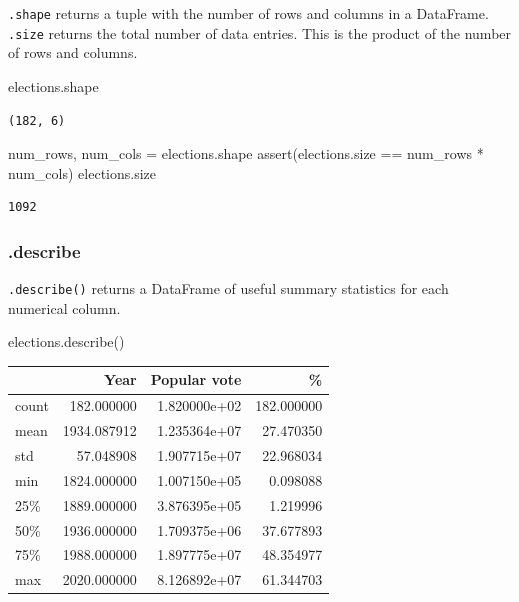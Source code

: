\documentclass[
  letterpaper,
  DIV=11,
  numbers=noendperiod]{scrreprt}
\newenvironment{Shaded}{\begin{snugshade}}{\end{snugshade}}
\newcommand{\ControlFlowTok}[1]{\textcolor[rgb]{0.00,0.23,0.31}{#1}}
\newcommand{\NormalTok}[1]{\textcolor[rgb]{0.00,0.23,0.31}{#1}}
\newcommand{\OperatorTok}[1]{\textcolor[rgb]{0.37,0.37,0.37}{#1}}
\begin{document}
\texttt{.shape} returns a tuple with the number of rows and columns in a
DataFrame. \texttt{.size} returns the total number of data entries. This
is the product of the number of rows and columns.

\begin{Shaded}
\begin{Highlighting}[]
\NormalTok{elections.shape}
\end{Highlighting}
\end{Shaded}

\begin{verbatim}
(182, 6)
\end{verbatim}

\begin{Shaded}
\begin{Highlighting}[]
\NormalTok{num\_rows, num\_cols }\OperatorTok{=}\NormalTok{ elections.shape}
\ControlFlowTok{assert}\NormalTok{(elections.size }\OperatorTok{==}\NormalTok{ num\_rows }\OperatorTok{*}\NormalTok{ num\_cols)}
\NormalTok{elections.size}
\end{Highlighting}
\end{Shaded}

\begin{verbatim}
1092
\end{verbatim}

\hypertarget{describe}{%
\subsubsection{.describe}\label{describe}}

\texttt{.describe()} returns a DataFrame of useful summary statistics
for each numerical column.

\begin{Shaded}
\begin{Highlighting}[]
\NormalTok{elections.describe()}
\end{Highlighting}
\end{Shaded}

\begin{tabular}{lrrr}
\toprule
{} &         Year &  Popular vote &           \% \\
\midrule
count &   182.000000 &  1.820000e+02 &  182.000000 \\
mean  &  1934.087912 &  1.235364e+07 &   27.470350 \\
std   &    57.048908 &  1.907715e+07 &   22.968034 \\
min   &  1824.000000 &  1.007150e+05 &    0.098088 \\
25\%   &  1889.000000 &  3.876395e+05 &    1.219996 \\
50\%   &  1936.000000 &  1.709375e+06 &   37.677893 \\
75\%   &  1988.000000 &  1.897775e+07 &   48.354977 \\
max   &  2020.000000 &  8.126892e+07 &   61.344703 \\
\bottomrule
\end{tabular}
\end{document}
